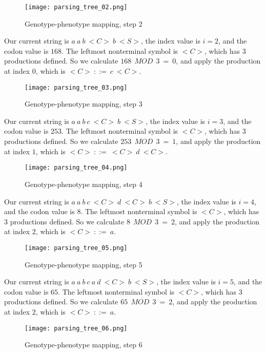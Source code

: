 \begin{figure}[H]
	\centering
	\texttt{[image: parsing\_tree\_02.png]}
	\caption{Genotype-phenotype mapping, step 2}
\end{figure}

\clearpage

Our current string is $a\:a\:b\:{<}C{>}\:b\:{<}S{>}$, the index value is $i = 2$, and the codon value is $168$. The leftmost nonterminal symbol is ${<}C{>}$, which has $3$ productions defined. So we calculate $168\:\:MOD\:\:3\:=\:0$, and apply the production at index $0$, which is ${<}C{>}\:::=\:c\:{<}C{>}$.

\begin{figure}[H]
	\centering
	\texttt{[image: parsing\_tree\_03.png]}
	\caption{Genotype-phenotype mapping, step 3}
\end{figure}

Our current string is $a\:a\:b\:c\:{<}C{>}\:b\:{<}S{>}$, the index value is $i = 3$, and the codon value is $253$. The leftmost nonterminal symbol is ${<}C{>}$, which has $3$ productions defined. So we calculate $253\:\:MOD\:\:3\:=\:1$, and apply the production at index $1$, which is ${<}C{>}\:::=\:{<}C{>}\:d\:{<}C{>}$.

\begin{figure}[H]
	\centering
	\texttt{[image: parsing\_tree\_04.png]}
	\caption{Genotype-phenotype mapping, step 4}
\end{figure}

Our current string is $a\:a\:b\:c\:{<}C{>}\:d\:{<}C{>}\:b\:{<}S{>}$, the index value is $i = 4$, and the codon value is $8$. The leftmost nonterminal symbol is ${<}C{>}$, which has $3$ productions defined. So we calculate $8\:\:MOD\:\:3\:=\:2$, and apply the production at index $2$, which is ${<}C{>}\:::=\:a$.

\begin{figure}[H]
	\centering
	\texttt{[image: parsing\_tree\_05.png]}
	\caption{Genotype-phenotype mapping, step 5}
\end{figure}

\clearpage

Our current string is $a\:a\:b\:c\:a\:d\:{<}C{>}\:b\:{<}S{>}$, the index value is $i = 5$, and the codon value is $65$. The leftmost nonterminal symbol is ${<}C{>}$, which has $3$ productions defined. So we calculate $65\:\:MOD\:\:3\:=\:2$, and apply the production at index $2$, which is ${<}C{>}\:::=\:a$.

\begin{figure}[H]
	\centering
	\texttt{[image: parsing\_tree\_06.png]}
	\caption{Genotype-phenotype mapping, step 6}
\end{figure}

